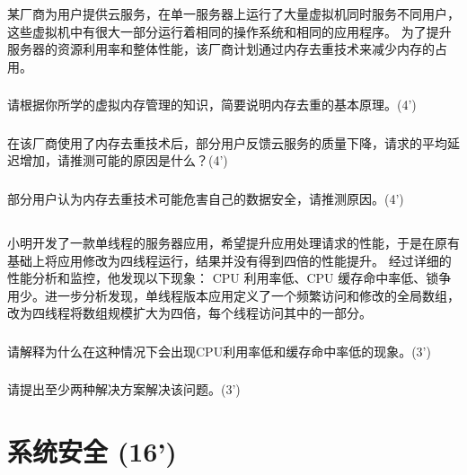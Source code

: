 \documentclass[a4paper,12pt]{article}
\newcommand{\score}[1]{(#1')}
\begin{document}
某厂商为用户提供云服务，在单一服务器上运行了大量虚拟机同时服务不同用户，这些虚拟机中有很大一部分运行着相同的操作系统和相同的应用程序。
为了提升服务器的资源利用率和整体性能，该厂商计划通过内存去重技术来减少内存的占用。

\subsubsection{}

请根据你所学的虚拟内存管理的知识，简要说明内存去重的基本原理。\score{4}

\subsubsection{}

在该厂商使用了内存去重技术后，部分用户反馈云服务的质量下降，请求的平均延迟增加，请推测可能的原因是什么？\score{4}

\subsubsection{}

部分用户认为内存去重技术可能危害自己的数据安全，请推测原因。\score{4}

\subsection{}

小明开发了一款单线程的服务器应用，希望提升应用处理请求的性能，于是在原有基础上将应用修改为四线程运行，结果并没有得到四倍的性能提升。
经过详细的性能分析和监控，他发现以下现象： CPU 利用率低、CPU 缓存命中率低、锁争用少。进一步分析发现，单线程版本应用定义了一个频繁访问和修改的全局数组，改为四线程将数组规模扩大为四倍，每个线程访问其中的一部分。

\subsubsection{}

请解释为什么在这种情况下会出现CPU利用率低和缓存命中率低的现象。\score{3}

\subsubsection{}

请提出至少两种解决方案解决该问题。\score{3}


\section{系统安全 \score{16}}
\end{document}

